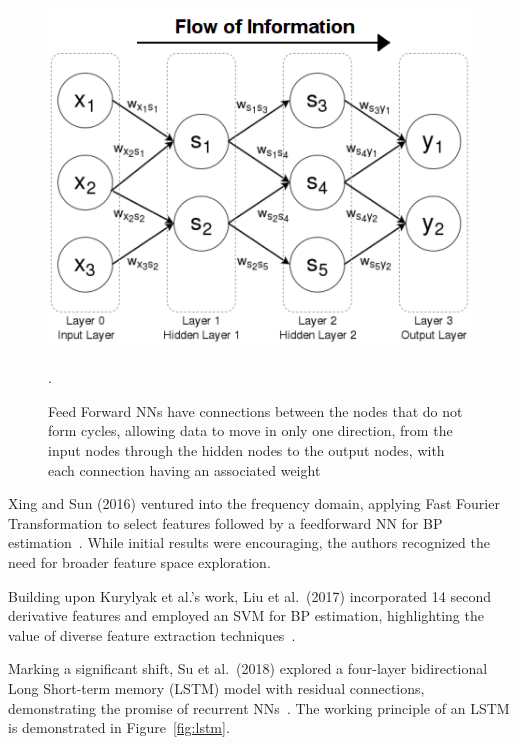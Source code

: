 \begin{figure}[h]
    \centering
    \includegraphics[scale=0.5]{images/ml/ffnn}
    \caption{\small Feed Forward NNs have connections between the nodes that do not form cycles, allowing data to move in only one direction, from the input nodes through the hidden nodes to the output nodes, with each connection having an associated weight~\cite{FeedforwardNeuralNetworks}}.
    \label{fig:ffnn}
\end{figure}

Xing and Sun (2016) ventured into the frequency domain, applying Fast Fourier Transformation to select features followed by a feedforward NN for BP estimation~\cite{xingOpticalBloodPressure2016}.
While initial results were encouraging, the authors recognized the need for broader feature space exploration.

Building upon Kurylyak et al.'s work, Liu et al.\ (2017) incorporated 14 second derivative features and employed an SVM for BP estimation, highlighting the value of diverse feature extraction techniques~\cite{liuIntegratedNavigationTethered2017}.

Marking a significant shift, Su et al.\ (2018) explored a four-layer bidirectional Long Short-term memory (LSTM) model with residual connections, demonstrating the promise of recurrent NNs~\cite{suLongtermBloodPressure2018}.
The working principle of an LSTM is demonstrated in Figure~\ref{fig:lstm}.

